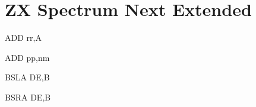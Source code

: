 \section{ZX Spectrum Next Extended}
\label{zx_next_instructions_table}

\begin{minipage}{\textwidth}

\begin{instrtable}

	\begin{instruction}{ADD rr,A} 
			\FlagsADDrra
		\SkipToOpCode 
	\end{instruction}

	\begin{instruction}{ADD pp,nm} 
			\FlagsADDrrnn
		\SkipToOpCode 
		\SkipToOpCode 
		\SkipToOpCode 
	\end{instruction}

	\begin{instruction}{BSLA DE,B} 
		\Symbol{\SymBSLA[0]}
			\FlagsBSLA
		\SkipToOpCode 
	\end{instruction}

	\begin{instruction}{BSRA DE,B} 
		\SymbolS{\SymBSRA[0]}
			\FlagsBSRA
		\SkipToSymbol
			\SymbolP{\SymBSRA[1]}
			\FromSymbolToOpCode
	\end{instruction}


\end{instrtable}
\end{minipage}
